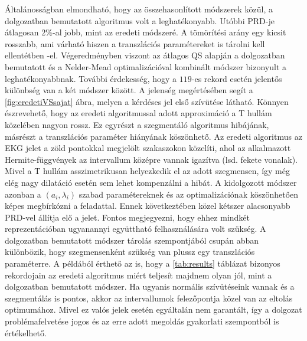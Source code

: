 \documentclass[oneside,titlepage,12pt,a4paper]{report}
\begin{document}
Általánosságban elmondható, hogy az összehasonlított módszerek közül, a dolgozatban bemutatott algoritmus volt a leghatékonyabb. Utóbbi PRD-je átlagosan $2\%$-al jobb, mint az eredeti módszeré. A tömörítési arány egy kicsit rosszabb, ami várható hiszen a transzlációs paramétereket is tárolni kell ellentétben \cite{origCikk}-el. Végeredményben viszont az átlagos QS alapján a dolgozatban bemutatott és a Nelder-Mead optimalizációval kombinált módszer bizonyult a leghatékonyabbnak. További érdekesség, hogy a $119$-es rekord esetén jelentős különbség van a két módszer között. A jelenség megértésében segít a \ref{fig:eredetiVSsajat} ábra, melyen a kérdéses jel első szívütése látható. Könnyen észrevehető, hogy az eredeti algoritmussal adott approximáció a T hullám közelében nagyon rossz. Ez egyrészt a szegmentáló algoritmus hibájának, másrészt a transzlációs paraméter hiányának köszönhető. Az eredeti algoritmus az EKG jelet a zöld pontokkal megjelölt szakaszokon közelíti, ahol az alkalmazott Hermite-függvények az intervallum középre vannak igazítva (lsd. fekete vonalak). Mivel a T hullám asszimetrikusan helyezkedik el az adott szegmensen, így még elég nagy dilatáció esetén sem lehet kompenzálni a hibát. A kidolgozott módszer azonban a $(a_i,\lambda_i)$ szabad paramétereknek és az optimalizációnak köszönhetően képes megbírkózni a feladattal. Ennek következtében közel kétszer alacsonyabb PRD-vel állítja elő a jelet. Fontos megjegyezni, hogy ehhez mindkét reprezentációban ugyanannyi együttható felhasználására volt szükség. A dolgozatban bemutatott módszer tárolás szempontjából csupán abban különbözik, hogy szegmensenként szükség van plussz egy transzlációs paraméterre. A példából érthető az is, hogy a \ref{tab:results} táblázat bizonyos rekordojain az eredeti algoritmus miért teljesít majdnem olyan jól, mint a dolgozatban bemutatott módszer. Ha ugyanis normális szívütéseink vannak és a szegmentálás is pontos, akkor az intervallumok felezőpontja közel van az eltolás optimumához. Mivel ez valós jelek esetén egyáltalán nem garantált, így a dolgozat problémafelvetése jogos és az erre adott megoldás gyakorlati szempontból is értékelhető.
\end{document}
